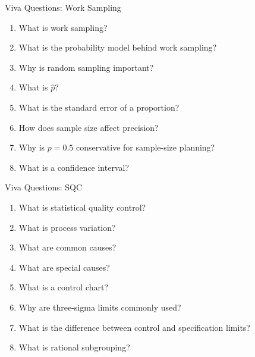 \documentclass[aspectratio=169,10pt]{beamer}
\begin{document}

\begin{frame}[shrink=18]{Viva Questions: Work Sampling}
\small

\begin{enumerate}
    \item What is work sampling?
    \item What is the probability model behind work sampling?
    \item Why is random sampling important?
    \item What is \(\hat p\)?
    \item What is the standard error of a proportion?
    \item How does sample size affect precision?
    \item Why is \(p=0.5\) conservative for sample-size planning?
    \item What is a confidence interval?
\end{enumerate}

\end{frame}


\begin{frame}[shrink=18]{Viva Questions: SQC}
\small

\begin{enumerate}
    \item What is statistical quality control?
    \item What is process variation?
    \item What are common causes?
    \item What are special causes?
    \item What is a control chart?
    \item Why are three-sigma limits commonly used?
    \item What is the difference between control and specification limits?
    \item What is rational subgrouping?
\end{enumerate}

\end{frame}

\end{document}
